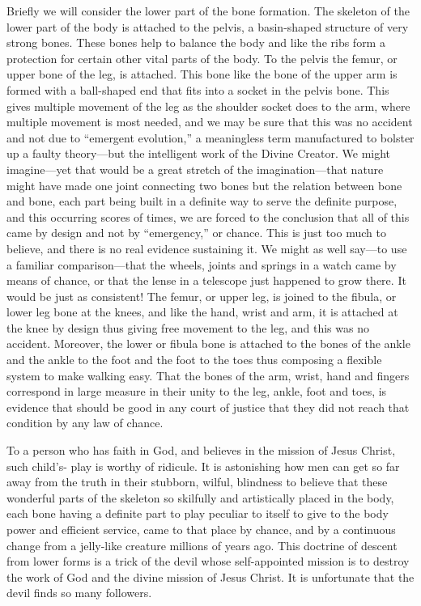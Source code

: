 Briefly we will consider the lower part of the bone formation. The skeleton of the lower part
of the body is attached to the pelvis, a basin-shaped structure of very strong bones. These
bones help to balance the body and like the ribs form a protection for certain other vital parts
of the body. To the pelvis the femur, or upper bone of the leg, is attached. This bone like the
bone of the upper arm is formed with a ball-shaped end that fits into a socket in the pelvis
bone. This gives multiple movement of the leg as the shoulder socket does to the arm, where
multiple movement is most needed, and we may be sure that this was no accident and not due
to ``emergent evolution,'' a meaningless term manufactured to bolster up a faulty theory—but
the intelligent work of the Divine Creator. We might imagine—yet that would be a great
stretch of the imagination—that nature might have made one joint connecting two bones but
the relation between bone and bone, each part being built in a definite way to serve the
definite purpose, and this occurring scores of times, we are forced to the conclusion that all
of this came by design and not by ``emergency,'' or chance. This is just too much to believe,
and there is no real evidence sustaining it. We might as well say—to use a familiar
comparison—that the wheels, joints and springs in a watch came by means of chance, or that
the lense in a telescope just happened to grow there. It would be just as consistent! The
femur, or upper leg, is joined to the fibula, or lower leg bone at the knees, and like the hand,
wrist and arm, it is attached at the knee by design thus giving free movement to the leg, and
this was no accident. Moreover, the lower or fibula bone is attached to the bones of the ankle
and the ankle to the foot and the foot to the toes thus composing a flexible system to make
walking easy. That the bones of the arm, wrist, hand and fingers correspond in large measure
in their unity to the leg, ankle, foot and toes, is evidence that should be good in any court of
justice that they did not reach that condition by any law of chance.

To a person who has faith in God, and believes in the mission of Jesus Christ, such child's-
play is worthy of ridicule. It is astonishing how men can get so far away from the truth in
their stubborn, wilful, blindness to believe that these wonderful parts of the skeleton so
skilfully and artistically placed in the body, each bone having a definite part to play peculiar
to itself to give to the body power and efficient service, came to that place by chance, and by
a continuous change from a jelly-like creature millions of years ago. This doctrine of descent
from lower forms is a trick of the devil whose self-appointed mission is to destroy the work
of God and the divine mission of Jesus Christ. It is unfortunate that the devil finds so many
followers.

